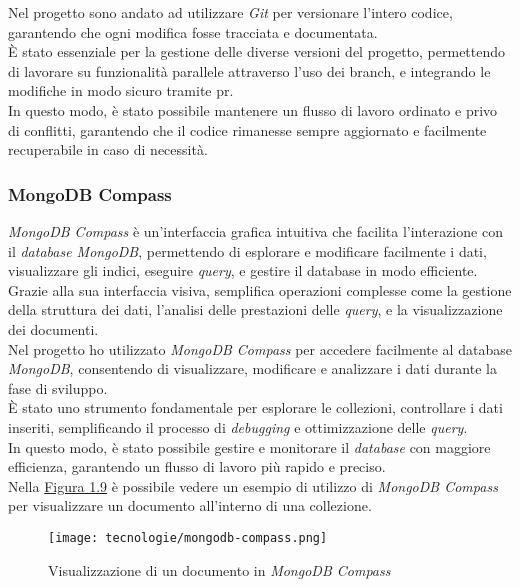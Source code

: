 \noindent Nel progetto sono andato ad utilizzare \textit{Git} per versionare l'intero codice, garantendo che ogni modifica fosse tracciata e documentata. \\
È stato essenziale per la gestione delle diverse versioni del progetto, permettendo di lavorare su funzionalità parallele attraverso l'uso dei \gls{branch}, e integrando le modifiche in modo sicuro tramite \gls{pr}. \\
In questo modo, è stato possibile mantenere un flusso di lavoro ordinato e privo di conflitti, garantendo che il codice rimanesse sempre aggiornato e facilmente recuperabile in caso di necessità. 

\subsubsection{MongoDB Compass}

\textit{MongoDB Compass} è un'interfaccia grafica intuitiva che facilita l'interazione con il \textit{database MongoDB}, permettendo di esplorare e modificare facilmente i dati, visualizzare gli indici, eseguire \textit{query}, e gestire il database in modo efficiente.\\
Grazie alla sua interfaccia visiva, semplifica operazioni complesse come la gestione della struttura dei dati, l'analisi delle prestazioni delle \textit{query}, e la visualizzazione dei documenti.\\

\noindent Nel progetto ho utilizzato \textit{MongoDB Compass}  per accedere facilmente al database \textit{MongoDB}, consentendo di visualizzare, modificare e analizzare i dati durante la fase di sviluppo.\\
È stato uno strumento fondamentale per esplorare le collezioni, controllare i dati inseriti, semplificando il processo di \textit{debugging} e ottimizzazione delle \textit{query}.\\
In questo modo, è stato possibile gestire e monitorare il \textit{database} con maggiore efficienza, garantendo un flusso di lavoro più rapido e preciso.\\

\noindent Nella {\hyperref[fig:mongodb-compass]{Figura 1.9}} è possibile vedere un esempio di utilizzo di \textit{MongoDB Compass} per visualizzare un documento all'interno di una collezione.

\begin{figure}[H]
    \label{fig:mongodb-compass}
    \centering
    \texttt{[image: tecnologie/mongodb-compass.png]}
    \caption{Visualizzazione di un documento in \textit{MongoDB Compass}}
\end{figure}
